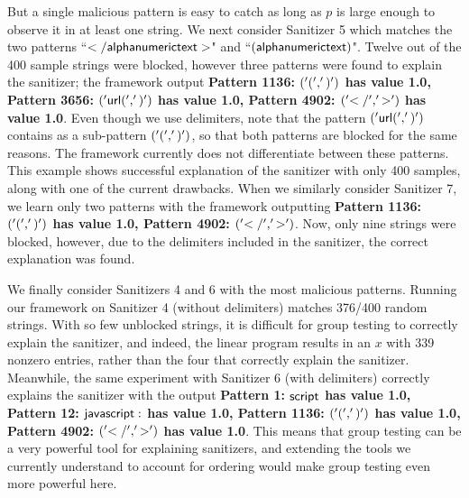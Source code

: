 But a single malicious pattern is easy to catch as long as $p$ is large enough to observe it in at least one string. We next consider Sanitizer 5 which matches the two patterns ``$\sf{</alphanumerictext>}$" and ``$\sf{(alphanumerictext)}$". Twelve out of the 400 sample strings were blocked, however three patterns were found to explain the sanitizer; the framework output \textbf{Pattern 1136: $\sf{('(', ')')}$ has value 1.0, Pattern 3656: $\sf{('url(', ')')}$ has value 1.0, Pattern 4902: $\sf{('</', '>')}$ has value 1.0}. Even though we use delimiters, note that the pattern $\sf{('url(', ')')}$ contains as a sub-pattern $\sf{('(', ')')}$, so that both patterns are blocked for the same reasons. The framework currently does not differentiate between these patterns. This example shows successful explanation of the sanitizer with only 400 samples, along with one of the current drawbacks. When we similarly consider Sanitizer 7, we learn only two patterns with the framework outputting \textbf{Pattern 1136: $\sf{('(', ')')}$ has value 1.0, Pattern 4902: $\sf{('</', '>')}$}. Now, only nine strings were blocked, however, due to the delimiters included in the sanitizer, the correct explanation was found.
	
We finally consider Sanitizers 4 and 6 with the most malicious patterns. Running our framework on Sanitizer 4 (without delimiters) matches 376/400 random strings.  With so few unblocked strings, it is difficult for group testing to correctly explain the sanitizer, and indeed, the linear program results in an $x$ with 339 nonzero entries, rather than the four that correctly explain the sanitizer. Meanwhile, the same experiment with Sanitizer 6 (with delimiters) correctly explains the sanitizer with the output \textbf{Pattern 1: $\sf{script}$ has value 1.0, Pattern 12: $\sf{javascript:}$ has value 1.0, Pattern 1136: $\sf{('(', ')')}$ has value 1.0, Pattern 4902: $\sf{('</', '>')}$ has value 1.0}. This means that group testing can be a very powerful tool for explaining sanitizers, and extending the tools we currently understand to account for ordering would make group testing even more powerful here.